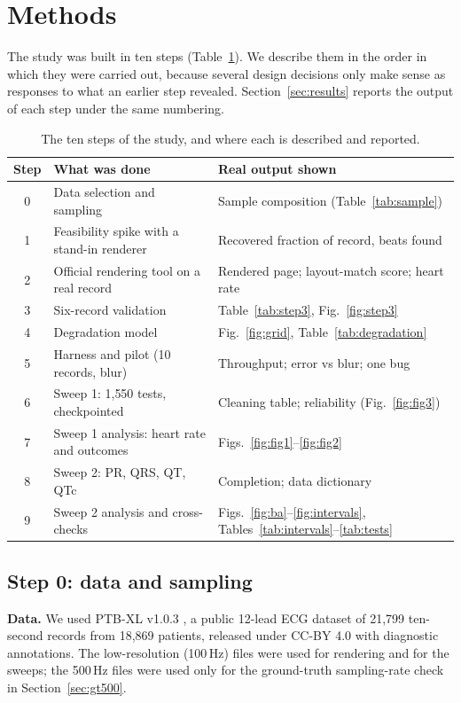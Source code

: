 \section{Methods}\label{sec:methods}

The study was built in ten steps (Table~\ref{tab:steps}). We describe them in the order in which they were carried out, because several design decisions only make sense as responses to what an earlier step revealed. Section~\ref{sec:results} reports the output of each step under the same numbering.

\begin{table}[ht]
\centering\small
\caption{The ten steps of the study, and where each is described and reported.}\label{tab:steps}
\begin{tabularx}{\textwidth}{@{}c>{\raggedright\arraybackslash}p{5.2cm}>{\raggedright\arraybackslash}X@{}}
\toprule
Step & What was done & Real output shown \\
\midrule
0 & Data selection and sampling & Sample composition (Table~\ref{tab:sample}) \\
1 & Feasibility spike with a stand-in renderer & Recovered fraction of record, beats found \\
2 & Official rendering tool on a real record & Rendered page; layout-match score; heart rate \\
3 & Six-record validation & Table~\ref{tab:step3}, Fig.~\ref{fig:step3} \\
4 & Degradation model & Fig.~\ref{fig:grid}, Table~\ref{tab:degradation} \\
5 & Harness and pilot (10 records, blur) & Throughput; error vs blur; one bug \\
6 & Sweep 1: 1{,}550 tests, checkpointed & Cleaning table; reliability (Fig.~\ref{fig:fig3}) \\
7 & Sweep 1 analysis: heart rate and outcomes & Figs.~\ref{fig:fig1}--\ref{fig:fig2} \\
8 & Sweep 2: PR, QRS, QT, QTc & Completion; data dictionary \\
9 & Sweep 2 analysis and cross-checks & Figs.~\ref{fig:ba}--\ref{fig:intervals}, Tables~\ref{tab:intervals}--\ref{tab:tests} \\
\bottomrule
\end{tabularx}
\end{table}

\subsection{Step 0: data and sampling}
\textbf{Data.} We used PTB-XL v1.0.3 \citep{ref45}, a public 12-lead ECG dataset of 21{,}799 ten-second records from 18{,}869 patients, released under CC-BY 4.0 with diagnostic annotations. The low-resolution (100\,Hz) files were used for rendering and for the sweeps; the 500\,Hz files were used only for the ground-truth sampling-rate check in Section~\ref{sec:gt500}.

